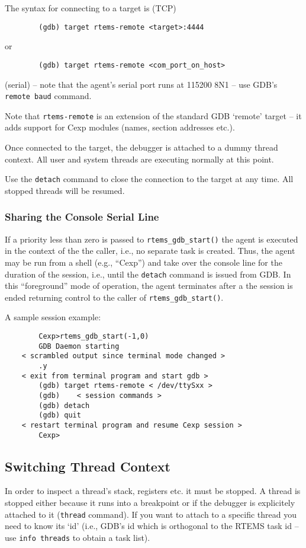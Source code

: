 \documentclass{article}
\newcommand{\cmd}[1]{{\tt #1}}
\begin{document}
	The syntax for connecting to a target is (TCP)
\begin{verbatim}
		(gdb) target rtems-remote <target>:4444
\end{verbatim}
	or
\begin{verbatim}
		(gdb) target rtems-remote <com_port_on_host>
\end{verbatim}
	(serial) -- note that the agent's serial port runs at
	115200 8N1 -- use GDB's \cmd{remote baud} command.

	Note that \cmd{rtems-remote} is an extension of the
	standard GDB `remote' target -- it adds support
	for Cexp modules (names, section addresses etc.).

	Once connected to the target, the debugger is
	attached to a dummy thread context. All user and
	system threads are executing normally at this point.

	Use the \cmd{detach} command to close the connection
	to the target at any time. All stopped threads will
	be resumed.

\subsubsection{Sharing the Console Serial Line}
	If a priority less than zero is passed to {\verb|rtems_gdb_start()|}
    the agent is executed in the context of the the caller, i.e.,
    no separate task is created. Thus, the agent may be run from
    a shell (e.g., ``Cexp'') and take over the console line for
    the duration of the session, i.e., until the \cmd{detach}
    command is issued from GDB. In this ``foreground'' mode
    of operation, the agent terminates after a the session is ended
    returning control to the caller of {\verb|rtems_gdb_start()|}.

	A sample session example:
\begin{verbatim}
	    Cexp>rtems_gdb_start(-1,0)
	    GDB Daemon starting
	< scrambled output since terminal mode changed >
	    .y
	< exit from terminal program and start gdb >
	    (gdb) target rtems-remote < /dev/ttySxx >
	    (gdb)    < session commands >
	    (gdb) detach
	    (gdb) quit
	< restart terminal program and resume Cexp session >
	    Cexp>
\end{verbatim}

\subsection{Switching Thread Context}
	In order to inspect a thread's stack, registers etc.
	it must be stopped.
	A thread is stopped either because it runs into a
	breakpoint or if the debugger is explicitely
	attached to it (\cmd{thread} command). If you want to attach
	to a specific thread you need to know its `id'
	(i.e., GDB's id which is orthogonal to the RTEMS task id
	-- use \cmd{info threads} to obtain a task list).
\end{document}

